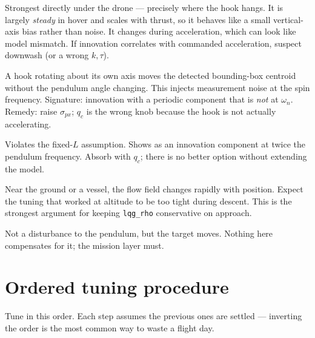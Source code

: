 \documentclass[11pt,a4paper]{article}
\newcommand{\param}[1]{\texttt{\small #1}}
\begin{document}
\begin{description}[leftmargin=1.4cm,style=nextline]
\item[Rotor downwash] Strongest directly under the drone --- precisely where
the hook hangs. It is largely \emph{steady} in hover and scales with thrust, so
it behaves like a small vertical-axis bias rather than noise. It changes during
acceleration, which can look like model mismatch. If innovation correlates with
commanded acceleration, suspect downwash (or a wrong $k,\tau$).

\item[Payload spin] A hook rotating about its own axis moves the detected
bounding-box centroid without the pendulum angle changing. This injects
measurement noise at the spin frequency. Signature: innovation with a periodic
component that is \emph{not} at $\omega_n$. Remedy: raise $\sigma_{px}$; $q_c$
is the wrong knob because the hook is not actually accelerating.

\item[Rope stretch / non-rigid rope] Violates the fixed-$L$ assumption. Shows
as an innovation component at twice the pendulum frequency. Absorb with $q_c$;
there is no better option without extending the model.

\item[Ground effect and obstacles] Near the ground or a vessel, the flow field
changes rapidly with position. Expect the tuning that worked at altitude to be
too tight during descent. This is the strongest argument for keeping
\param{lqg\_rho} conservative on approach.

\item[Vessel motion (recovery to a moving deck)] Not a disturbance to the
pendulum, but the target moves. Nothing here compensates for it; the mission
layer must.
\end{description}

\section{Ordered tuning procedure}
\label{sec:recipe}

Tune in this order. Each step assumes the previous ones are settled ---
inverting the order is the most common way to waste a flight day.
\end{document}
